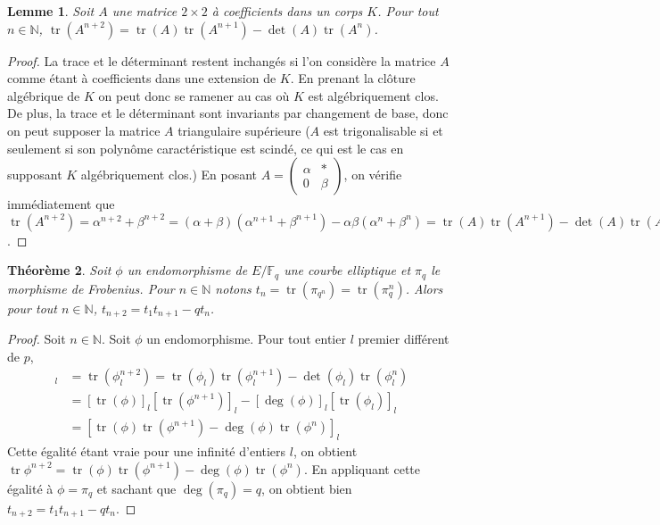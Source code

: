 \documentclass{article}
\theoremstyle{plain}%
\newtheorem{thm}{Théorème}[section]
\newtheorem{lem}[thm]{Lemme}
\theoremstyle{definition}%
\newcommand{\F}{\mathbb{F}}
\newcommand{\N}{\mathbb{N}}
\DeclareMathOperator{\tr}{tr}
\begin{document}
\begin{lem}
  Soit $A$ une matrice $2\times 2$ à coefficients dans un corps $K$. Pour tout $n\in\N$, $\tr(A^{n+2}) = \tr(A)\tr(A^{n+1}) - \det(A)\tr(A^n)$.
\end{lem}

\begin{proof}
  La trace et le déterminant restent inchangés si l'on considère la matrice $A$ comme étant à coefficients dans une extension de $K$. En prenant la clôture algébrique de $K$ on peut donc se ramener au cas où $K$ est algébriquement clos. De plus, la trace et le déterminant sont invariants par changement de base, donc on peut supposer la matrice $A$ triangulaire supérieure ($A$ est trigonalisable si et seulement si son polynôme caractéristique est scindé, ce qui est le cas en supposant $K$ algébriquement clos.) En posant $A = \begin{pmatrix} \alpha & * \\ 0 & \beta \end{pmatrix}$, on vérifie immédiatement que $\tr(A^{n+2}) = \alpha^{n+2} + \beta^{n+2} = (\alpha + \beta)(\alpha^{n+1} + \beta^{n+1}) - \alpha\beta(\alpha^n + \beta^n) = \tr(A)\tr(A^{n+1}) - \det(A)\tr(A^n)$.
\end{proof}

\begin{thm}
  \label{récurrence}
  Soit $\phi$ un endomorphisme de $E/\F_q$ une courbe elliptique et $\pi_q$ le morphisme de Frobenius. Pour $n\in\N$ notons $t_n = \tr(\pi_{q^n}) = \tr(\pi_q^n)$. Alors pour tout $n\in\N$, $t_{n+2} = t_1t_{n+1} - qt_n$.
\end{thm}

\begin{proof}
  Soit $n\in\N$. Soit $\phi$ un endomorphisme. Pour tout entier $l$ premier différent de $p$, 
  \begin{align*} 
    [\tr\phi^{n+2}]_l 
    &= \tr(\phi_l^{n+2}) 
    = \tr(\phi_l)\tr(\phi_l^{n+1})-\det(\phi_l)\tr(\phi_l^n) \\
    &= [\tr(\phi)]_l [\tr(\phi^{n+1})]_l-[\deg(\phi)]_l[\tr(\phi_l)]_l \\
    &= [\tr(\phi)\tr(\phi^{n+1})-\deg(\phi)\tr(\phi^n)]_l 
  \end{align*}
  Cette égalité étant vraie pour une infinité d'entiers $l$, on obtient $\tr\phi^{n+2} =  \tr(\phi)\tr(\phi^{n+1})-\deg(\phi)\tr(\phi^n)$. En appliquant cette égalité à $\phi = \pi_q$ et sachant que $\deg(\pi_q)=q$, on obtient bien $t_{n+2} = t_1t_{n+1}-qt_n$. 

\end{proof}
\end{document}
